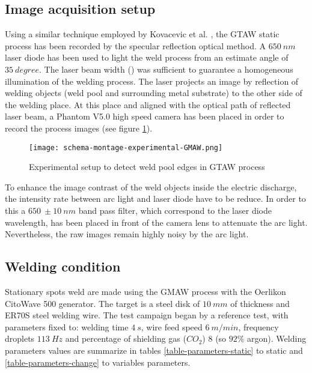 \begin{Segmentation}
\subsection{ Image acquisition setup}
\label{ image_acquisition_setup}

Using a similar technique employed by Kovacevic et al. \cite{KOVACEVIC}, the GTAW static process has been recorded by the specular reflection optical method. A $650\ nm$ laser diode has been used to light the weld process from an estimate angle of $35\ degree$. The laser beam width ($ $) was sufficient to guarantee a homogeneous illumination of the welding process. The laser projects an image by reflection of welding objects (weld pool and surrounding metal substrate) to the other side of the welding place. At this place and aligned with the optical path of reflected laser beam, a Phantom V5.0 high speed camera has been placed in order to record the process images (see figure \ref{schema-montage-experimental-GTAW}). 

\begin{figure}
\begin{center}
\texttt{[image: schema-montage-experimental-GMAW.png]}
\caption{{\small Experimental setup to detect weld pool edges in GTAW process}}
\label{schema-montage-experimental-GTAW}
\end{center}
\end{figure}

To enhance the image contrast of the weld objects inside the electric discharge, the intensity rate between arc light and laser diode have to be reduce. In order to this a $650\ \pm 10\ nm$ band pass filter, which correspond to the laser diode wavelength, has been placed in front of the camera lens to attenuate the arc light. Nevertheless, the raw images remain highly noisy by the arc light. 


\subsection{ Welding condition}
\label{ welding_conditions}

Stationary spots weld are made using the GMAW process with the Oerlikon
 CitoWave 500 generator. The target is a steel disk of $10\ mm$ of
 thickness and ER70S steel welding wire.
The test campaign began by a reference test, with parameters fixed
 to:  welding time $4\ s$, wire feed speed $6\ m/min$, frequency 
droplets $113\ Hz$ and percentage of shielding gas ($CO_{2}$) $8$
 (so $92\%$ argon). Welding parameters values are summarize in 
tables \ref{table-parameters-static} to static and
 \ref{table-parameters-change} to variables parameters.


\end{Segmentation}
